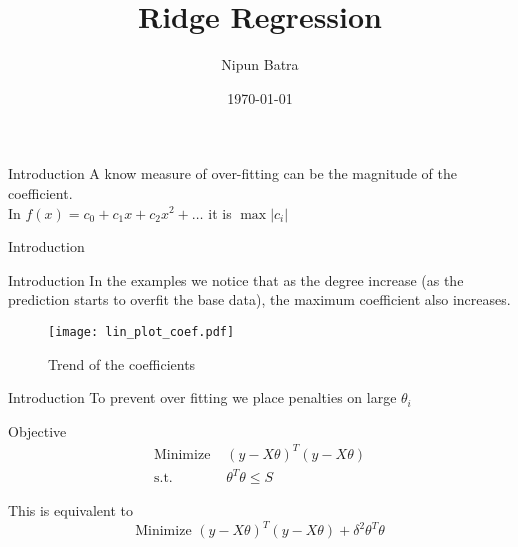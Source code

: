 \documentclass{beamer}
\title{Ridge Regression}
\date{\today}
\author{Nipun Batra}
\institute{IIT Gandhinagar}
\begin{document}
  \maketitle

\begin{frame}{Introduction}
A know measure of over-fitting can be the magnitude of the coefficient. \\ \bigskip
\pause
In $f(x) = c_0 + c_1x + c_2x^2 + \dots$ it is $\max|c_i|$ \\ \bigskip
\end{frame}
  
\begin{frame}{Introduction}
\vspace{0.4cm}
\end{frame}  

\begin{frame}{Introduction}
\vspace{0.4cm}
In the examples we notice that as the degree increase (as the prediction starts to overfit the base data), the maximum coefficient also increases.
\begin{figure}\texttt{[image: lin\_plot\_coef.pdf]}\caption{Trend of the coefficients}\end{figure}

\end{frame}
 
\begin{frame}{Introduction}
\vspace{0.4cm}
To prevent over fitting we place penalties on large $\theta_i$
\pause
 \\ \bigskip
\begin{tcolorbox}{Objective}
\begin{align*}
\text{Minimize } & \left(y-X\theta\right)^T\left(y-X\theta\right) \\
\text{s.t. } & \theta ^T\theta \leq S
\end{align*}
\end{tcolorbox}
\pause
This is equivalent to \vspace{-0.4cm}
$$
\text{Minimize } \left(y-X\theta\right)^T\left(y-X\theta\right) + \delta ^2\theta ^T\theta
$$
\end{frame}  
\end{document}
